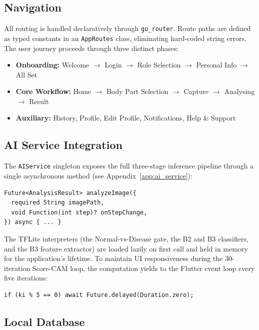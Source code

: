 \subsection{Navigation}

All routing is handled declaratively through \texttt{go\_router}. Route paths are defined as typed constants in an \texttt{AppRoutes} class, eliminating hard-coded string errors. The user journey proceeds through three distinct phases:

\begin{itemize}
    \item \textbf{Onboarding:} Welcome $\rightarrow$ Login $\rightarrow$ Role Selection $\rightarrow$ Personal Info $\rightarrow$ All Set
    \item \textbf{Core Workflow:} Home $\rightarrow$ Body Part Selection $\rightarrow$ Capture $\rightarrow$ Analysing $\rightarrow$ Result
    \item \textbf{Auxiliary:} History, Profile, Edit Profile, Notifications, Help \& Support
\end{itemize}

\subsection{AI Service Integration}

The \texttt{AIService} singleton exposes the full three-stage inference pipeline through a single asynchronous method (see Appendix~\ref{app:ai_service}):

\begin{verbatim}
Future<AnalysisResult> analyzeImage({
  required String imagePath,
  void Function(int step)? onStepChange,
}) async { ... }
\end{verbatim}

The TFLite interpreters (the Normal-vs-Disease gate, the B2 and B3 classifiers, and the B3 feature extractor) are loaded lazily on first call and held in memory for the application's lifetime. To maintain UI responsiveness during the 30-iteration Score-CAM loop, the computation yields to the Flutter event loop every five iterations:

\begin{verbatim}
if (ki % 5 == 0) await Future.delayed(Duration.zero);
\end{verbatim}

\subsection{Local Database}

